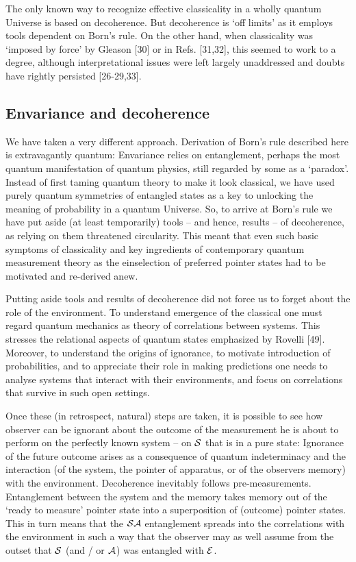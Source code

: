 \documentclass[aps,pra,epsfig,11pt,floatfix]{revtex4}
\begin{document}
The only known way to recognize effective classicality in a wholly 
quantum Universe is based on decoherence. But decoherence is 
`off limits' as it employs tools dependent on Born's rule. On the 
other hand, when classicality was `imposed by force' by Gleason [30] 
or in Refs. [31,32], this seemed to work to a degree, although 
interpretational issues were left largely unaddressed and doubts 
have rightly persisted [26-29,33].

\subsection{Envariance and decoherence}

We have taken a very different approach. Derivation of Born's rule described
here is extravagantly quantum: Envariance relies on entanglement, perhaps
the most quantum manifestation of quantum physics, still regarded by some as
a `paradox'. Instead of first taming quantum theory to make it look classical, 
we have used purely quantum symmetries of entangled states as a key 
to unlocking the meaning of probability in a quantum Universe. So, to
arrive at Born's rule we have put aside (at least temporarily) tools -- and
hence, results -- of decoherence, as relying on them threatened circularity. 
This meant that even such basic symptoms of classicality and key ingredients 
of contemporary quantum measurement theory as the einselection of preferred
pointer states had to be motivated and re-derived anew.

Putting aside tools and results of decoherence did not force us to forget about
the role of the environment. To understand emergence of the classical one must
regard quantum mechanics as theory of correlations between systems. This 
stresses the relational aspects of quantum states emphasized
by Rovelli [49]. Moreover, to understand the origins of ignorance, to motivate 
introduction of probabilities, and to appreciate their role in making predictions
one needs to analyse systems that interact with their environments, and focus
on correlations that survive in such open settings.

Once these (in retrospect, natural) steps are taken, it is possible to see how 
observer can be ignorant about the outcome of the measurement he is about
to perform on the perfectly known system -- on ${\cal S}$ that is in a pure state:
Ignorance of the future outcome arises as a consequence of quantum 
indeterminacy and the interaction (of the system, the pointer of apparatus, or of
the observers memory) with the environment. Decoherence inevitably follows
pre-measurements. Entanglement between the system and the memory takes memory
out of the `ready to measure' pointer state into a superposition of (outcome)
pointer states. This in turn means that the ${\cal SA}$ entanglement spreads
into the correlations with the environment in such a way that the observer may
as well assume from the outset that ${\cal S}$ (and / or ${\cal A}$) was
entangled with ${\cal E}$.
\end{document}
